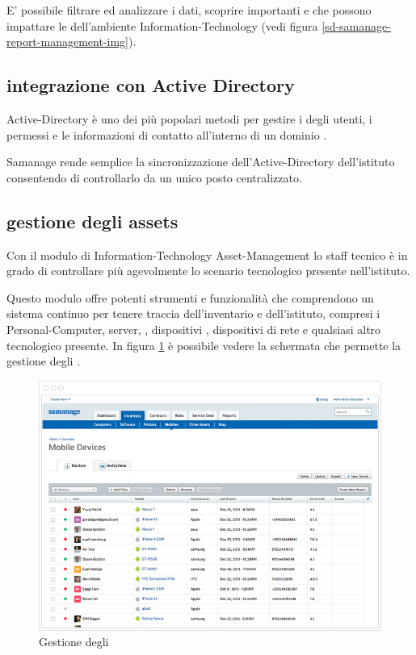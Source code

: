 E' possibile filtrare ed analizzare i dati, scoprire importanti  e  che possono impattare le  dell'ambiente \acs{Information-Technology} (vedi figura \ref{sd-samanage-report-management-img}).

\subsection[Integrazione con Active Directory]{integrazione con Active Directory}
\label{sd-samanage-active-directory}
\acf{Active-Directory} è uno dei più popolari metodi per gestire i  degli utenti, i permessi e le informazioni di contatto all'interno di un dominio .

Samanage rende semplice la sincronizzazione dell'\ac{Active-Directory} dell'istituto consentendo di controllarlo da un unico posto centralizzato.

\subsection[Gestione degli assets]{gestione degli assets}
\label{sd-samanage-assets-management}
Con il modulo di \acs{Information-Technology} \ac{Asset-Management} lo staff tecnico è in grado di controllare più agevolmente lo scenario tecnologico presente nell'istituto.

Questo modulo offre potenti strumenti e funzionalità che comprendono un sistema continuo per tenere traccia dell'inventario  e  dell'istituto, compresi i \acs{Personal-Computer}, server, , dispositivi , dispositivi di rete e qualsiasi altro  tecnologico presente. In figura \ref{sd-samanage-asset-management-img} è possibile vedere la schermata che permette la gestione degli .

\begin{figure}[htbp]
\centering
\includegraphics[scale=0.6]{Images/samanage/Asset_management.png}
\caption{Gestione degli }
\label{sd-samanage-asset-management-img}
\end{figure}

